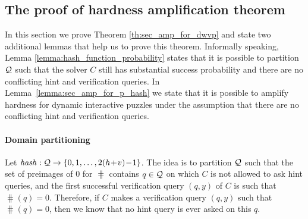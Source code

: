 %
\subsection{The proof of hardness amplification theorem}
\label{st:mainTheoremProof}
In this section we prove Theorem \ref{th:sec_amp_for_dwvp} and state two additional lemmas that help us to prove this theorem.
Informally speaking, Lemma \ref{lemma:hash_function_probability} states that it is possible to partition $\mathcal{Q}$ such that
the solver $C$ still has substantial success probability and there are no conflicting hint and verification queries.
In Lemma~\ref{lemma:sec_amp_for_p_hash} we state that it is possible to amplify hardness for dynamic interactive puzzles
under the assumption that there are no conflicting hint and verification queries.

\paragraph{Domain partitioning} Let $\operatorname{\mathit{hash}}:\mathcal{Q}\rightarrow\{0,1,\dots, 2(h\!+\!v)\!-\!1\}$. The idea is to partition $\mathcal{Q}$ such that the set of preimages
of $0$ for $\hash$ contains $q \in \mathcal{Q}$ on which $C$ is not allowed to ask hint queries,
and the first successful verification query $(q,y)$ of $C$ is such that $\hash(q) = 0$.
Therefore, if $C$ makes a verification query $(q,y)$ such that $\hash(q) = 0$, then we know that no hint query is ever asked on this $q$.

